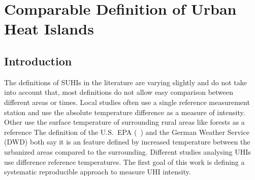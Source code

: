 \documentclass[12pt,a4paper, english]{article}
\begin{document}
    
\newpage
\section{Comparable Definition of Urban Heat Islands}\label{sec:definition}
    \subsection{Introduction}
      The definitions of \glspl{SUHI} in the literature are varying slightly and do not take into account that, most definitions do not allow easy comparison between different areas or times.
      Local studies often use a single reference measurement station and use the absolute temperature difference as a measure of intensity.%
      Other use the surface temperature of surrounding rural areas like forests as a reference%
      The definition of the U.S.~EPA (~\autocite{EPA2008}) and the German Weather Service (\gls{DWD}) both say it is an feature defined by increased temperature between the urbanized areas compared to the surrounding.
      Different studies analysing \glspl{UHI} use difference reference temperatures.
      The first goal of this work is defining a systematic reproducible approach to measure \gls{UHI} intensity.
%
\end{document}
